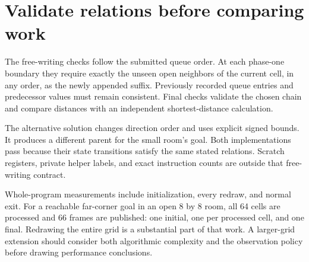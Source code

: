 \section{Validate relations before comparing work}\label{maze-p12}

The free-writing checks follow the submitted queue order. At each phase-one boundary they require exactly the unseen open neighbors of the current cell, in any order, as the newly appended suffix. Previously recorded queue entries and predecessor values must remain consistent. Final checks validate the chosen chain and compare distances with an independent shortest-distance calculation.

The alternative solution changes direction order and uses explicit signed bounds. It produces a different parent for the small room's goal. Both implementations pass because their state transitions satisfy the same stated relations. Scratch registers, private helper labels, and exact instruction counts are outside that free-writing contract.

Whole-program measurements include initialization, every redraw, and normal exit. For a reachable far-corner goal in an open 8 by 8 room, all 64 cells are processed and 66 frames are published: one initial, one per processed cell, and one final. Redrawing the entire grid is a substantial part of that work. A larger-grid extension should consider both algorithmic complexity and the observation policy before drawing performance conclusions.
